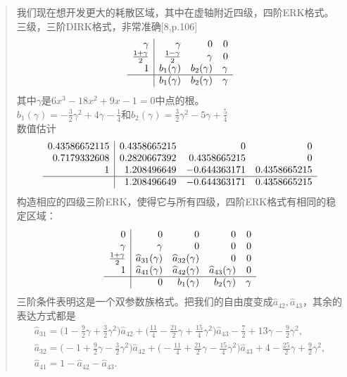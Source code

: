 \documentclass{article}
\begin{document}
\begin{CJK}{UTF8}{gkai}
\begin{quotation}
我们现在想开发更大的耗散区域，其中在虚轴附近四级，四阶ERK格式。三级，三阶DIRK格式，非常准确[8,p.106]
\[
\begin{array}{r|rrr}
\gamma & \gamma & 0 & 0\\
\frac{1+\gamma }{2} & \frac{1-\gamma }{2} & \gamma  & 0 \\
1 & b_{1}(\gamma ) &  b_{2}(\gamma ) & \gamma \\
\hline
&  b_{1}(\gamma ) &  b_{2}(\gamma ) &\gamma
\end{array}
\]
其中$\gamma$是$6x^3-18x^2+9x-1=0$中点的根。\\
$b_{1}(\gamma)=-\frac{3}{2}\gamma^2+4\gamma-\frac{1}{4}$和$b_{2}(\gamma)=\frac{3}{2}\gamma^2-5\gamma+\frac{5}{4}$\\
数值估计
\[
\begin{array}{r|rrr}
0.43586652115 & 0.4358665215 & 0 & 0\\
0.7179332608 &0.2820667392 & 0.4358665215 & 0\\
1 & 1.208496649 & -0.644363171 & 0.4358665215 \\
\hline
& 1.208496649 & -0.644363171 & 0.4358665215
\end{array}
\]
构造相应的四级三阶ERK，使得它与所有四级，四阶ERK格式有相同的稳定区域：
\[
\begin{array}{r|rrrr}
0 & 0 & 0 & 0 & 0 \\
\gamma & \gamma & 0 & 0 & 0\\
\frac{1+\gamma}{2} & \widehat{a}_{31}(\gamma) & \widehat{a}_{32}(\gamma) & 0 & 0\\
1 & \widehat{a}_{41}(\gamma) & \widehat{a}_{42}(\gamma) & \widehat{a}_{43}(\gamma) & 0\\
\hline
& 0 & b_{1}(\gamma) & b_{2}(\gamma) & \gamma 
\end{array}
\]
三阶条件表明这是一个双参数族格式。把我们的自由度变成$\widehat{a}_{42},\widehat{a}_{43}$，其余的表达方式都是
\begin{gather}
\widehat{a}_{31}=\bigg(1-\frac{9}{2}\gamma+\frac{3}{2}\gamma^2\biggl)\widehat{a}_{42}+\bigg(\frac{11}{4}-\frac{21}{2}\gamma+\frac{15}{4}\gamma^2\biggl)\widehat{a}_{43}-\frac{7}{2}+13\gamma-\frac{9}{2}\gamma^2,\\
\widehat{a}_{32}=\bigg (-1+\frac{9}{2}\gamma-\frac{3}{2}\gamma^2\biggl)\widehat{a}_{42}+\bigg(-\frac{11}{4}+\frac{21}{2}\gamma-\frac{15}{4}\gamma^2\biggl)\widehat{a}_{43}+4-\frac{25}{2}\gamma+\frac{9}{2}\gamma^2,\\
\widehat{a}_{41}=1-\widehat{a}_{42}-\widehat{a}_{43}.
\end{gather}


\end{quotation}
\end{CJK}
\end{document}
